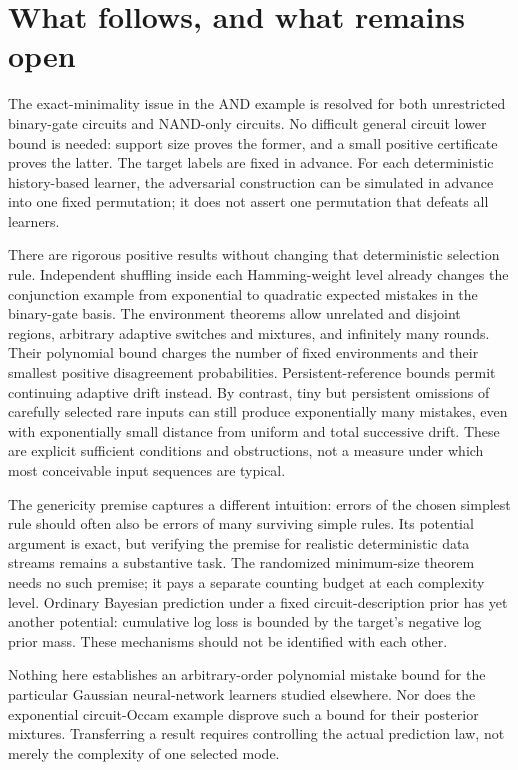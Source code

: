 \documentclass[11pt]{article}
\begin{document}
\section{What follows, and what remains open}

The exact-minimality issue in the AND example is resolved for both
unrestricted binary-gate circuits and NAND-only circuits. No difficult
general circuit lower bound is needed: support size proves the former,
and a small positive certificate proves the latter. The target labels
are fixed in advance. For each deterministic history-based learner, the
adversarial construction can be simulated in advance into one fixed
permutation; it does not assert one permutation that defeats all learners.

There are rigorous positive results without changing that deterministic
selection rule. Independent shuffling inside each Hamming-weight level
already changes the conjunction example from exponential to quadratic
expected mistakes in the binary-gate basis. The environment theorems
allow unrelated and disjoint regions, arbitrary adaptive switches and
mixtures, and infinitely many rounds. Their polynomial bound charges the
number of fixed environments and their smallest positive disagreement
probabilities. Persistent-reference bounds permit continuing adaptive
drift instead. By contrast, tiny but persistent omissions of carefully
selected rare inputs can still produce exponentially many mistakes, even
with exponentially small distance from uniform and total successive drift.
These are explicit sufficient conditions and obstructions, not a measure
under which most conceivable input sequences are typical.

The genericity premise captures a different intuition: errors of the
chosen simplest rule should often also be errors of many surviving
simple rules. Its potential argument is exact, but verifying the premise
for realistic deterministic data streams remains a substantive task.
The randomized minimum-size theorem needs no such premise; it pays a
separate counting budget at each complexity level. Ordinary Bayesian
prediction under a fixed circuit-description prior has yet another
potential: cumulative log loss is bounded by the target's negative log
prior mass. These mechanisms should not be identified with each other.

Nothing here establishes an arbitrary-order polynomial mistake bound for
the particular Gaussian neural-network learners studied elsewhere.
Nor does the exponential circuit-Occam example disprove such a bound for
their posterior mixtures. Transferring a result requires controlling the
actual prediction law, not merely the complexity of one selected mode.
\end{document}
